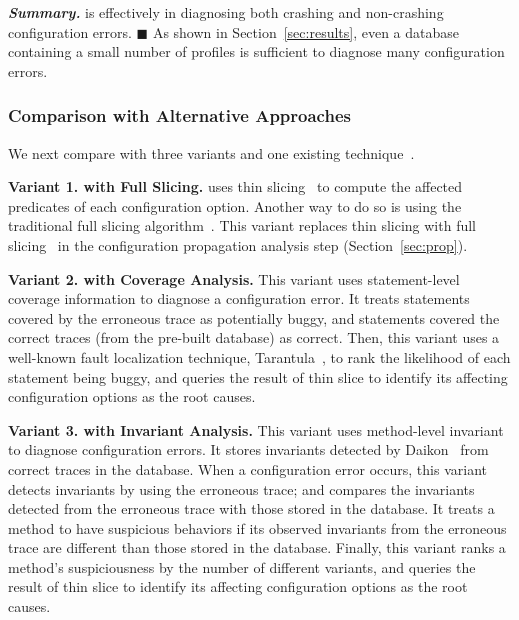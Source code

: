


\vspace{1mm}
\noindent \textbf{\textit{Summary.}} \ourtool is effectively
in diagnosing both crashing and non-crashing configuration errors. $\blacksquare$
As shown
in Section~\ref{sec:results}, even a database containing
a small number of profiles is sufficient to
diagnose many configuration errors.

\subsubsection{Comparison with Alternative Approaches}
\label{sec:comparison}

We next compare \ourtool with three variants and
one existing technique~\cite{Rabkin:2011:PPC}.

\vspace{1mm}
\noindent \textbf{Variant 1. \ourtool with Full Slicing.} 
\ourtool uses thin slicing~\cite{Sridharan:2007} to compute the affected predicates
of each configuration option. Another way to do so is
using the traditional full slicing algorithm~\cite{Horwitz:1988}.
This variant replaces thin slicing with 
full slicing~\cite{Horwitz:1988} in the configuration
propagation analysis step (Section~\ref{sec:prop}).

\vspace{1mm}
\noindent \textbf{Variant 2. \ourtool with Coverage Analysis.}
This variant uses statement-level coverage information
to diagnose a configuration error. It treats statements covered
by the erroneous trace as potentially buggy, and statements
covered the correct traces (from the pre-built database) as correct.
Then, this variant uses a well-known fault localization technique,
Tarantula~\cite{Jones:2002}, to rank the likelihood of each
statement being buggy, and queries the result of thin slice
to identify its affecting configuration options as the root causes. 


\vspace{1mm}
\noindent \textbf{Variant 3. \ourtool with Invariant Analysis.}
This variant uses method-level invariant
to diagnose configuration errors. It stores invariants detected
by Daikon~\cite{Ernst:1999} from correct traces in the database. When a configuration
error occurs, this variant detects invariants by using the erroneous trace;
and compares the invariants detected from
the erroneous trace with those stored in the database.
It treats a method to have suspicious behaviors if its observed invariants
from the erroneous trace are different than those stored in the database. Finally, this variant ranks
a method's suspiciousness by the number of different variants, and
queries the result of thin slice
to identify its affecting configuration options as the root causes. 

